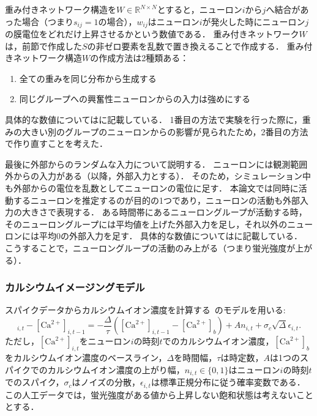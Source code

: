 重み付きネットワーク構造を$W \in \mathbb{R}^{N \times N}$とすると，ニューロン$i$から$j$へ結合があった場合（つまり$s_{ij} = 1$の場合），$w_{ij}$はニューロン$i$が発火した時にニューロン$j$の膜電位をどれだけ上昇させるかという数値である．
重み付きネットワーク$W$は，前節で作成した$S$の非ゼロ要素を乱数で置き換えることで作成する．
重み付きネットワーク構造$W$の作成方法は2種類ある：
\begin{enumerate}
  \item 全ての重みを同じ分布から生成する
  \item 同じグループへの興奮性ニューロンからの入力は強めにする
\end{enumerate}
具体的な数値についてはに記載している．
1番目の方法で実験を行った際に，重みの大きい別のグループのニューロンからの影響が見られたため，2番目の方法で作り直すことを考えた．

最後に外部からのランダムな入力について説明する．
ニューロンには観測範囲外からの入力がある（以降，外部入力とする）．
そのため，シミュレーション中も外部からの電位を乱数としてニューロンの電位に足す．
本論文では同時に活動するニューロンを推定するのが目的の1つであり，ニューロンの活動も外部入力の大きさで表現する．
ある時間帯にあるニューロングループが活動する時，そのニューロングループには平均値を上げた外部入力を足し，それ以外のニューロンには平均$0$の外部入力を足す．
具体的な数値についてはに記載している．
こうすることで，ニューロングループの活動のみ上がる（つまり蛍光強度が上がる）．

\subsubsection{カルシウムイメージングモデル}
スパイクデータからカルシウムイオン濃度を計算する~\cite{Vogelstein2009}のモデルを用いる:
\begin{equation}
  [\text{Ca}^{2+}]_{i,t} - [\text{Ca}^{2+}]_{i,t-1} = - \frac{\Delta}{\tau}([\text{Ca}^{2+}]_{i,t-1} - [\text{Ca}^{2+}]_b) + An_{i,t} + \sigma_c \sqrt{\Delta} \epsilon_{i,t}.
  \label{eq:calcium}
\end{equation}
ただし，$[\text{Ca}^{2+}]_{i,t}$をニューロン$i$の時刻$t$でのカルシウムイオン濃度，$[\text{Ca}^{2+}]_b$をカルシウムイオン濃度のベースライン，$\Delta$を時間幅，$\tau$は時定数，$A$は1つのスパイクでのカルシウムイオン濃度の上がり幅，$n_{i,t} \in \{0,1\}$はニューロン$i$の時刻$t$でのスパイク，$\sigma_c$はノイズの分散，$\epsilon_{i,t}$は標準正規分布に従う確率変数である．
この人工データでは，蛍光強度がある値から上昇しない飽和状態は考えないこととする．

